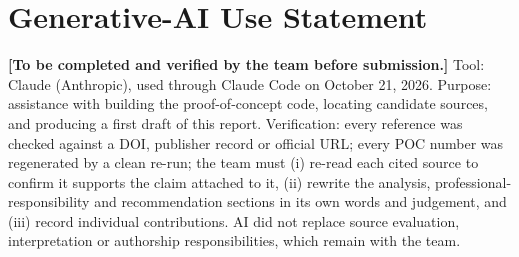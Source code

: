 \documentclass[journal,onecolumn,11pt]{IEEEtran}
\begin{document}
\section{Generative-AI Use Statement}
\label{app:ai}
\textbf{[To be completed and verified by the team before submission.]} Tool: Claude (Anthropic), used through Claude Code on October 21, 2026. Purpose: assistance with building the proof-of-concept code, locating candidate sources, and producing a first draft of this report. Verification: every reference was checked against a DOI, publisher record or official URL; every POC number was regenerated by a clean re-run; the team must (i) re-read each cited source to confirm it supports the claim attached to it, (ii) rewrite the analysis, professional-responsibility and recommendation sections in its own words and judgement, and (iii) record individual contributions. AI did not replace source evaluation, interpretation or authorship responsibilities, which remain with the team.
\end{document}
